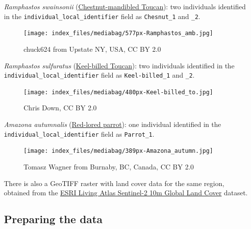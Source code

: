 \documentclass[
  letterpaper,
  DIV=11,
  numbers=noendperiod]{scrreprt}
\begin{document}
\emph{Ramphastos swainsonii}
(\href{https://en.wikipedia.org/wiki/Chestnut-mandibled_toucan}{Chestnut-mandibled
Toucan}): two individuals identified in the
\texttt{individual\_local\_identifier} field as \texttt{Chesnut\_1} and
\texttt{\_2}.\\

\begin{figure}[H]

{\centering \texttt{[image: index\_files/mediabag/577px-Ramphastos\_amb.jpg]}

}

\caption{chuck624 from Upstate NY, USA, CC BY 2.0}

\end{figure}%

\emph{Ramphastos sulfuratus}
(\href{https://en.wikipedia.org/wiki/Keel-billed_toucan}{Keel-billed
Toucan}): two individuals identified in the
\texttt{individual\_local\_identifier} field as \texttt{Keel-billed\_1}
and \texttt{\_2}.

\begin{figure}[H]

{\centering \texttt{[image: index\_files/mediabag/480px-Keel-billed\_to.jpg]}

}

\caption{Chris Down, CC BY 2.0}

\end{figure}%

\emph{Amazona autumnalis}
(\href{https://en.wikipedia.org/wiki/Red-lored_amazon}{Red-lored
parrot}): one individual identified in the
\texttt{individual\_local\_identifier} field as \texttt{Parrot\_1}.

\begin{figure}[H]

{\centering \texttt{[image: index\_files/mediabag/389px-Amazona\_autumn.jpg]}

}

\caption{Tomasz Wagner from Burnaby, BC, Canada, CC BY 2.0}

\end{figure}%

There is also a GeoTIFF raster with land cover data for the same region,
obtained from the
\href{https://www.arcgis.com/home/item.html?id=cfcb7609de5f478eb7666240902d4d3d}{ESRI
Living Atlas Sentinel-2 10m Global Land Cover} dataset.

\subsection{Preparing the data}\label{preparing-the-data-1}
\end{document}
